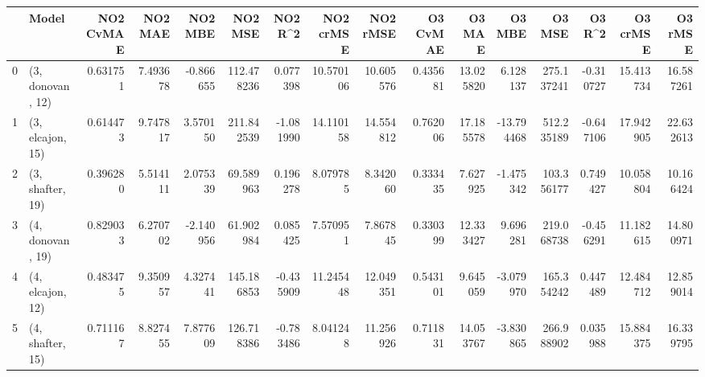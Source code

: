 \begin{tabular}{llrrrrrrrrrrrrrr}
\toprule
{} &             Model &  NO2 CvMAE &   NO2 MAE &   NO2 MBE &     NO2 MSE &   NO2 R\textasciicircum2 &  NO2 crMSE &   NO2 rMSE &  O3 CvMAE &     O3 MAE &     O3 MBE &      O3 MSE &    O3 R\textasciicircum2 &   O3 crMSE &    O3 rMSE \\
\midrule
0 &  (3, donovan, 12) &   0.631751 &  7.493678 & -0.866655 &  112.478236 &  0.077398 &  10.570106 &  10.605576 &  0.435681 &  13.025820 &   6.128137 &  275.137241 & -0.310727 &  15.413734 &  16.587261 \\
1 &  (3, elcajon, 15) &   0.614473 &  9.747817 &  3.570150 &  211.842539 & -1.081990 &  14.110158 &  14.554812 &  0.762006 &  17.185578 & -13.794468 &  512.235189 & -0.647106 &  17.942905 &  22.632613 \\
2 &  (3, shafter, 19) &   0.396280 &  5.514111 &  2.075339 &   69.589963 &  0.196278 &   8.079785 &   8.342060 &  0.333435 &   7.627925 &  -1.475342 &  103.356177 &  0.749427 &  10.058804 &  10.166424 \\
3 &  (4, donovan, 19) &   0.829033 &  6.270702 & -2.140956 &   61.902984 &  0.085425 &   7.570951 &   7.867845 &  0.330399 &  12.333427 &   9.696281 &  219.068738 & -0.456291 &  11.182615 &  14.800971 \\
4 &  (4, elcajon, 12) &   0.483475 &  9.350957 &  4.327441 &  145.186853 & -0.435909 &  11.245448 &  12.049351 &  0.543101 &   9.645059 &  -3.079970 &  165.354242 &  0.447489 &  12.484712 &  12.859014 \\
5 &  (4, shafter, 15) &   0.711167 &  8.827455 &  7.877609 &  126.718386 & -0.783486 &   8.041248 &  11.256926 &  0.711831 &  14.053767 &  -3.830865 &  266.988902 &  0.035988 &  15.884375 &  16.339795 \\
\bottomrule
\end{tabular}
